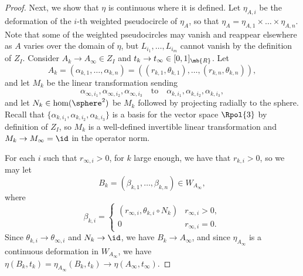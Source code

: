 \begin{proof}
Next, we show that $\eta$ is continuous where it is defined.
Let $\eta_{A,i}$ be the deformation of the $i$-th weighted pseudocircle of $\eta_A$, so that
$\eta_A = {\eta_{A,1} \times \dots \times \eta_{A,n}}$.
Note that some of the weighted pseudocircles may vanish and reappear elsewhere as $A$ varies over the domain of $\eta$, but $L_{i_1},\dots,L_{i_m}$ cannot vanish by the definition of $Z_I$.
Consider $A_k \to A_\infty \in Z_I$ and $t_k \to t_\infty \in [0,1]_\mb{R}$. Let
\[ A_k = (\alpha_{k,1},\dots,\alpha_{k,n}) = ((r_{k,1},\theta_{k,1}),\dots,(r_{k,n},\theta_{k,n})), \]
and let $M_k$ be the linear transformation sending
\[
\alpha_{\infty,i_1},\alpha_{\infty,i_2},\alpha_{\infty,i_3}\quad\text{to}\quad \alpha_{k,i_1},\alpha_{k,i_2},\alpha_{k,i_3},
\]
and let $N_k \in \hom(\sphere^2)$ be $M_k$ followed by projecting radially to the sphere.
Recall that $\{\alpha_{k,i_1},\alpha_{k,i_2},\alpha_{k,i_3}\}$ is a basis for the vector space $\Rpol{3}$ by definition of $Z_I$, so $M_k$ is a well-defined invertible linear transformation and $M_k \to M_\infty=\id$ in the operator norm.

For each $i$ such that $r_{\infty,i} > 0$, for $k$ large enough, we have that $r_{k,i} > 0$, so we may let
\[ B_k = (\beta_{k,1},\dots,\beta_{k,n}) \in W_{A_\infty}, \]
where
\[ \beta_{k,i} = \begin{cases}
(r_{\infty,i},\theta_{k,i} \circ N_k) & r_{\infty,i} > 0, \\
0 & r_{\infty,i} = 0.
\end{cases}\]
Since $\theta_{k,i} \to \theta_{\infty,i}$ and $N_k \to \id$, we have $B_k \to A_\infty$, and since $\eta_{A_\infty}$ is a continuous deformation in $W_{A_\infty}$, we have $\eta(B_k,t_k) = \eta_{A_\infty}(B_k,t_k) \to \eta(A_\infty,t_\infty)$.


\end{proof}
